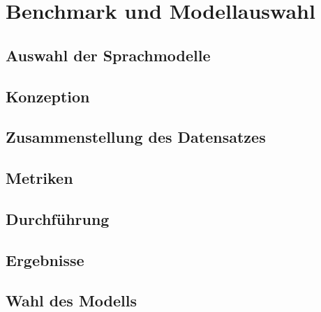 \chapter{Benchmark und Modellauswahl}\label{ch:benchmark}

\section{Auswahl der Sprachmodelle}\label{sec:modelle-benchmark}

\section{Konzeption}\label{sec:konzeption-benchmark}

\section{Zusammenstellung des Datensatzes}\label{sec:datensatz-benchmark}

\section{Metriken}\label{sec:metriken-benchmark}

\section{Durchführung}\label{sec:durchfuhrung-benchmark}

\section{Ergebnisse}\label{sec:ergebnisse-benchmark}

\section{Wahl des Modells}\label{sec:auswahl-modell-benchmark}